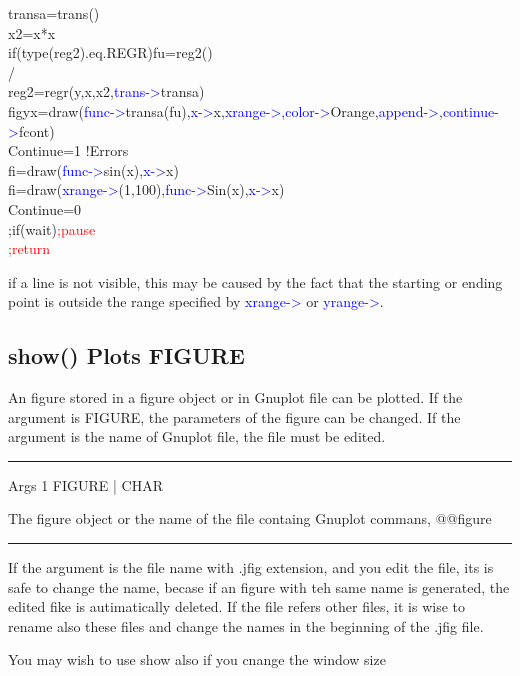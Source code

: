 \begin{example}[drawlineex]
transa=\textcolor{VioletRed}{trans}()\\
x2=x*x\\
\textcolor{VioletRed}{if}(\textcolor{VioletRed}{type}(reg2).eq.REGR)fu=reg2()\\
/\\
reg2=\textcolor{VioletRed}{regr}(y,x,x2,\textcolor{blue}{trans->}transa)\\
figyx=\textcolor{VioletRed}{draw}(\textcolor{blue}{func->}transa(fu),\textcolor{blue}{x->}x,\textcolor{blue}{xrange->},\textcolor{blue}{color->}Orange,\textcolor{blue}{append->},\textcolor{blue}{continue->}fcont)\\
Continue=1  !Errors\\
fi=\textcolor{VioletRed}{draw}(\textcolor{blue}{func->}\textcolor{VioletRed}{sin}(x),\textcolor{blue}{x->}x)\\
fi=\textcolor{VioletRed}{draw}(\textcolor{blue}{xrange->}(1,100),\textcolor{blue}{func->}Sin(x),\textcolor{blue}{x->}x)\\
Continue=0\\
;if(wait)\textcolor{Red}{;pause}\\
\textcolor{Red}{;return}
\end{example}
\begin{note}
if a line is not visible, this may be caused by the fact that
the starting or ending point is outside the range specified by \textcolor{blue}{xrange->} or \textcolor{blue}{yrange->}.
\end{note}
\subsection{\textcolor{VioletRed}{show}() Plots FIGURE}
\label{show}
An figure stored in a figure object or in Gnuplot file can be plotted. If the
argument is FIGURE, the
parameters of the figure can be changed. If the argument is the name of
Gnuplot file, the file must be edited.
\vspace{0.3cm}
\hrule
\vspace{0.3cm}
\noindent Args  \tabto{3cm}  1 \tabto{5cm}   FIGURE | CHAR  \tabto{7cm}
\begin{changemargin}{3cm}{0cm}
\noindent  The figure object or the name of the file containg Gnuplot commans,
@@figure
\end {changemargin}
\hrule
\vspace{0.2cm}
\begin{note}
If the argument is the file name with .jfig extension, and you edit the file, its is safe to change the name,
becase if an figure with teh same name is generated, the edited fike is autimatically
deleted. If the file refers other files, it is wise to rename also these files and change
the names in the beginning of the .jfig file.
\end{note}
\begin{note}
You may wish to use show also if you cnange the window size
\end{note}

